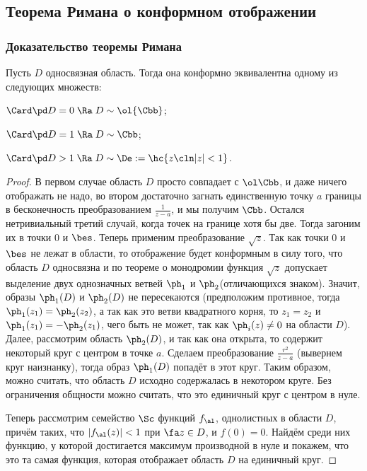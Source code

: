 \documentclass[a4paper]{article}
\begin{document}
\begin{theorem}
\subsection{Теорема Римана о конформном отображении}

\subsubsection{Доказательство теоремы Римана}

\begin{theorem}
Пусть $D$ односвязная область. Тогда она конформно эквивалентна одному из следующих множеств:
\begin{items}{-2}
\item $\Card \pd D = 0 \; \Ra \; D \sim \ol{\Cbb}$;
\item $\Card \pd D = 1 \; \Ra \; D \sim \Cbb$;
\item $\Card \pd D > 1 \; \Ra \; D \sim \De := \hc{z\cln |z|<1}$.
\end{items}
\end{theorem}
\begin{proof}
В первом случае область $D$ просто совпадает с $\ol\Cbb$, и даже ничего отображать не надо, во втором достаточно загнать
единственную точку $a$ границы в бесконечность преобразованием $\frac{1}{z-a}$, и мы получим $\Cbb$.
Остался нетривиальный третий случай, когда точек на границе хотя бы две. Тогда загоним их в точки $0$ и $\bes$.
Теперь применим преобразование $\sqrt{z}$. Так как точки $0$ и $\bes$ не лежат в области, то отображение будет конформным
в силу того, что область $D$ односвязна и по теореме о монодромии функция $\sqrt{z}$
допускает выделение двух однозначных ветвей $\ph_1$ и $\ph_2$(отличающихся знаком). Значит, образы $\ph_1(D)$ и $\ph_2(D)$
не пересекаются (предположим противное, тогда $\ph_1(z_1)=\ph_2(z_2)$, а так как это ветви квадратного корня, то
$z_1=z_2$ и $\ph_1(z_1) = -\ph_2(z_1)$, чего быть не может, так как $\ph_i(z)\neq 0$ на области $D$).
Далее, рассмотрим область $\ph_2(D)$, и так как она открыта, то содержит некоторый круг с центром в точке $a$.
Сделаем преобразование $\frac{r^2}{z-a}$ (вывернем круг наизнанку), тогда образ $\ph_1(D)$ попадёт в этот круг.
Таким образом, можно считать, что область $D$ исходно содержалась
в некотором круге. Без ограничения общности можно считать, что это единичный круг с центром в нуле.

Теперь рассмотрим семейство $\Sc$ функций $f_\al$, однолистных в области $D$, причём  таких, что $|f_\al(z)| < 1$
при $\fa z \in D$, и $f(0)=0$. Найдём среди них функцию, у которой достигается максимум производной в нуле и покажем,
что это та самая функция, которая отображает область $D$ на единичный круг.


\end{proof}
\end{theorem}
\end{document}
